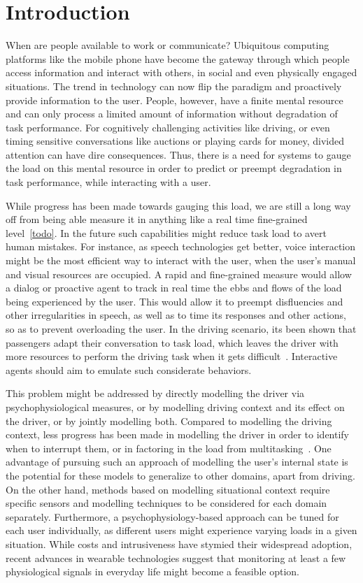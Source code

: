 \section{Introduction}
When are people available to work or communicate? Ubiquitous computing platforms like the mobile phone have become the gateway through which people access information and interact with others, in social and even physically engaged situations. The trend in technology can now  flip the paradigm and proactively provide information to the user. People, however, have a finite mental resource and can only process a limited amount of information without degradation of task performance. For cognitively challenging activities like driving, or even timing sensitive conversations like auctions or playing cards for money, divided attention can have dire consequences. Thus, there is a need for systems to gauge the load on this mental resource in order to predict or preempt degradation in task performance, while interacting with a user.

While progress has been made towards gauging this load, we are still a long way off from being able measure it in anything like a real time fine-grained level~\ref{todo}. In the future such capabilities might reduce task load to avert human mistakes. For instance, as speech technologies get better, voice interaction might be the most efficient way to interact with the user, when the user's manual and visual resources are occupied. A rapid and fine-grained measure would allow a dialog or proactive agent to track in real time the ebbs and flows of the load being experienced by the user. This would allow it to preempt disfluencies and other irregularities in speech, as well as to time its responses and other actions, so as to prevent overloading the user. In the driving scenario, its been shown that passengers adapt their conversation to task load, which leaves the driver with more resources to perform the driving task when it gets difficult~\cite{drews2008, cohen2014}. Interactive agents should aim to emulate such considerate behaviors.

This problem might be addressed by directly modelling the driver via psychophysiological measures, or by modelling driving context and its effect on the driver, or by jointly modelling both. Compared to modelling the driving context, less progress has been made in modelling the driver in order to identify when to interrupt them, or in factoring in the load from multitasking~\cite{kim2015}. One advantage of pursuing such an approach of modelling the user's internal state is the potential for these models to generalize to other domains, apart from driving. On the other hand, methods based on modelling situational context require specific sensors and modelling techniques to be considered for each domain separately. Furthermore, a psychophysiology-based approach can be tuned for each user individually, as different users might experience varying loads in a given situation. While costs and intrusiveness have stymied their widespread adoption, recent advances in wearable technologies suggest that monitoring at least a few physiological signals in everyday life might become a feasible option.

